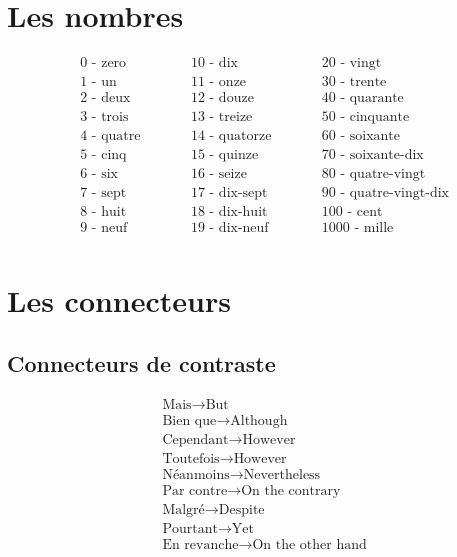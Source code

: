\documentclass[12pt, a4paper]{article}
\begin{document}
\begin{multicols*}{3}
\section{Les nombres}
\begin{alignat*}{3}
  &\text{0 - zero}\quad\quad&&\text{10 - dix}\quad\quad&&\text{20 - vingt}\\
  &\text{1 - un}\quad\quad&&\text{11 - onze}\quad\quad&&\text{30 - trente}\\
  &\text{2 - deux}\quad\quad&&\text{12 - douze}\quad\quad&&\text{40 - quarante}\\
  &\text{3 - trois}\quad\quad&&\text{13 - treize}\quad\quad&&\text{50 - cinquante}\\
  &\text{4 - quatre}\quad\quad&&\text{14 - quatorze}\quad\quad&&\text{60 - soixante}\\
  &\text{5 - cinq}\quad\quad&&\text{15 - quinze}\quad\quad&&\text{70 - soixante-dix}\\
  &\text{6 - six}\quad\quad&&\text{16 - seize}\quad\quad&&\text{80 - quatre-vingt}\\
  &\text{7 - sept}\quad\quad&&\text{17 - dix-sept}\quad\quad&&\text{90 - quatre-vingt-dix}\\
  &\text{8 - huit}\quad\quad&&\text{18 - dix-huit}\quad\quad&&\text{100 - cent}\\
  &\text{9 - neuf}\quad\quad&&\text{19 - dix-neuf}\quad\quad&&\text{1000 - mille}\\
\end{alignat*}
\colbreak
\colbreak

\section{Les connecteurs}
\subsection{Connecteurs de contraste}
\vspace{-10pt}
\begin{align*}
  &\text{Mais} \rightarrow \text{But}\\
  &\text{Bien que}\rightarrow\text{Although}\\
  &\text{Cependant} \rightarrow \text{However}\\
  &\text{Toutefois} \rightarrow \text{However}\\
  &\text{Néanmoins} \rightarrow \text{Nevertheless}\\
  &\text{Par contre} \rightarrow \text{On the contrary}\\
  &\text{Malgré}\rightarrow\text{Despite}\\
  &\text{Pourtant} \rightarrow \text{Yet}\\
  &\text{En revanche} \rightarrow \text{On the other hand}\\
\end{align*}
\vspace{-40pt}

\end{multicols*}
\end{document}
